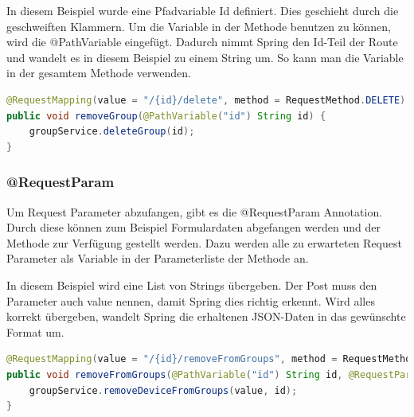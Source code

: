 In diesem Beispiel wurde eine Pfadvariable Id definiert. Dies geschieht durch die geschweiften Klammern. Um die Variable in der Methode benutzen zu können, wird die @PathVariable eingefügt. Dadurch nimmt Spring den Id-Teil der Route und wandelt es in diesem Beispiel zu einem String um. So kann man die Variable in der gesamtem Methode verwenden.
\begin{lstlisting}[language=java]
@RequestMapping(value = "/{id}/delete", method = RequestMethod.DELETE)
public void removeGroup(@PathVariable("id") String id) {
	groupService.deleteGroup(id);
}
\end{lstlisting}
\subsubsection{@RequestParam}
Um Request Parameter abzufangen, gibt es die @RequestParam Annotation. Durch diese können zum Beispiel Formulardaten abgefangen werden und der Methode zur Verfügung gestellt werden. Dazu werden alle zu erwarteten Request Parameter als Variable in der Parameterliste der Methode an.

In diesem Beispiel wird eine List von Strings übergeben. Der Post muss den Parameter auch value nennen, damit Spring dies richtig erkennt. Wird alles korrekt übergeben, wandelt Spring die erhaltenen JSON-Daten in das gewünschte Format um.
\begin{lstlisting}[language=java]
@RequestMapping(value = "/{id}/removeFromGroups", method = RequestMethod.POST)
public void removeFromGroups(@PathVariable("id") String id, @RequestParam("value") List<String> value) {
	groupService.removeDeviceFromGroups(value, id);
}
\end{lstlisting}
